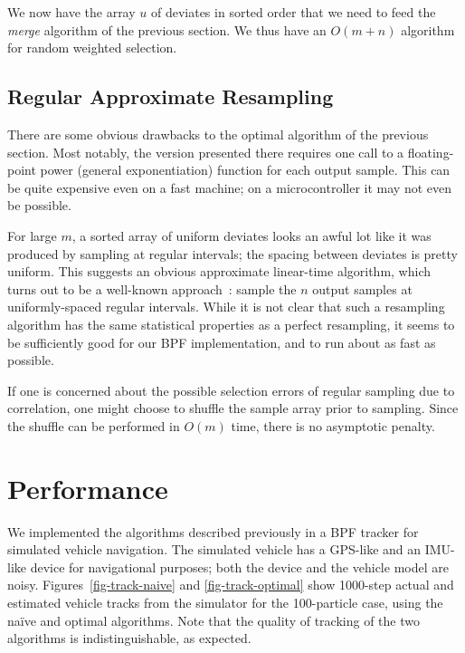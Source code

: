 \documentclass[12pt]{article}
\begin{document}
  We now have the array $u$ of deviates in sorted order that
  we need to feed the {\em merge} algorithm of the previous
  section.  We thus have an $O(m + n)$ algorithm for random
  weighted selection.

\subsection{Regular Approximate Resampling}\label{sec-regular}

  There are some obvious drawbacks to the optimal algorithm of
  the previous section.  Most notably, the version presented
  there requires one call to a floating-point power (general
  exponentiation) function for each output sample.  This can
  be quite expensive even on a fast machine; on a
  microcontroller it may not even be possible.

  For large $m$, a sorted array of uniform deviates looks an
  awful lot like it was produced by sampling at regular
  intervals; the spacing between deviates is pretty uniform.
  This suggests an obvious approximate linear-time
  algorithm, which turns out to be a well-known approach~\cite{kitigawa}:
  sample the $n$ output samples at uniformly-spaced regular
  intervals.  While it is not clear that such a resampling
  algorithm has the same statistical properties as a perfect
  resampling, it seems to be sufficiently good for our BPF
  implementation, and to run about as fast as possible.

  If one is concerned about the possible selection errors of
  regular sampling due to correlation, one might choose to
  shuffle the sample array prior to sampling.  Since the
  shuffle can be performed in $O(m)$ time, there is no
  asymptotic penalty.

\section{Performance}

  We implemented the algorithms described previously in a
  BPF tracker for simulated vehicle navigation.  The
  simulated vehicle has a GPS-like and an IMU-like device
  for navigational purposes; both the device and the vehicle
  model are noisy.  Figures~\ref{fig-track-naive} and
  \ref{fig-track-optimal} show 1000-step actual and estimated vehicle
  tracks from the simulator for the 100-particle case, using
  the na\"ive and optimal algorithms.  Note
  that the quality of tracking of the two algorithms is
  indistinguishable, as expected.
\end{document}
